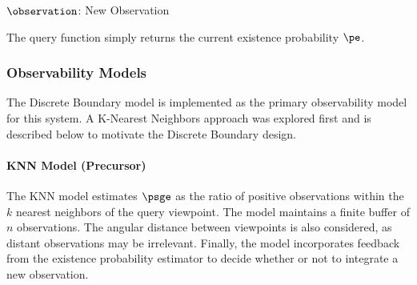 \begin{singlespace}
    \begin{algorithm}[H]
        \caption[VBEE Update]{VBEE Update: $\vbee.\update{\observation}$}
        \label{alg:vbee_update}
        \begin{algorithmic}
            \Require $\observation$: New Observation



        \end{algorithmic}
    \end{algorithm}
\end{singlespace}

The query function simply returns the current existence probability $\pe$.
\subsubsection{Observability Models}
\label{sec:observability_models}

The Discrete Boundary model is implemented as the primary observability model for this system. A K-Nearest Neighbors approach was explored first and is described below to motivate the Discrete Boundary design.

\paragraph{KNN Model (Precursor)}

The KNN model estimates $\psge$ as the ratio of positive observations within the $k$ nearest neighbors of the query viewpoint. The model maintains a finite buffer of $n$ observations. The angular distance between viewpoints is also considered, as distant observations may be irrelevant. Finally, the model incorporates feedback from the existence probability estimator to decide whether or not to integrate a new observation.


